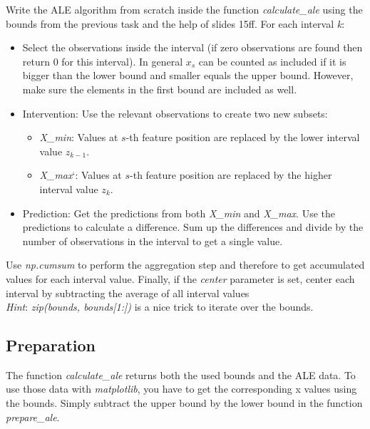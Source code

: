 \documentclass[a4paper]{article}
\begin{document}
Write the ALE algorithm from scratch inside the function \textit{calculate\_ale} using the bounds from the previous task and the help of slides 15ff. For each interval \textit{k}:
\begin{itemize}
    \item Select the observations inside the interval (if zero observations are found then return 0 for this interval). In general $x_s$ can be counted as included if it is bigger than the lower bound and smaller equals the upper bound. However, make sure the elements in the first bound are included as well.
    \item Intervention: Use the relevant observations to create two new subsets:
    
    \begin{itemize}
        \item \textit{X\_min}: Values at $s$-th feature position are replaced by the lower interval value $z_{k-1}$.
        \item \textit{X\_max}`: Values at $s$-th feature position are replaced by the higher interval value $z_k$.
    \end{itemize}

    \item Prediction: Get the predictions from both \textit{X\_min} and \textit{X\_max}. Use the predictions to calculate a
      difference. Sum up the differences and divide by the number of observations in the interval to get a single value.
    
\end{itemize}

\noindent Use \textit{np.cumsum} to perform the aggregation step and therefore to get accumulated values for each interval value. Finally, if the \textit{center} parameter is set, center each interval by subtracting the average of all interval values\\

\noindent \textit{Hint}: \textit{zip(bounds, bounds[1:])} is a nice trick to iterate over the bounds.


\subsection{Preparation}

The function \textit{calculate\_ale} returns both the used bounds and the ALE data. To use those data with \textit{matplotlib}, you have to get the corresponding x values using the bounds. Simply subtract the upper bound by the lower bound in the function \textit{prepare\_ale}.
\end{document}
